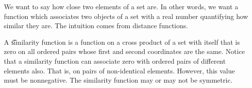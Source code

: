 
\sbasic





















\sstart
{}


We want to say how close two elements of a set are.
In other words, we want a function which associates two objects of a set with a real number quantifying how similar they are.
The intuition comes from distance functions.


A \t{similarity function} is a function on a cross product of a set with itself that is zero on all ordered pairs whose first and second coordinates are the same.
Notice that a similarity function can associate zero with ordered pairs of different elements also.
That is, on pairs of non-identical elements.
However, this value must be nonnegative.
The similarity function may or may not be symmetric.
\strats

